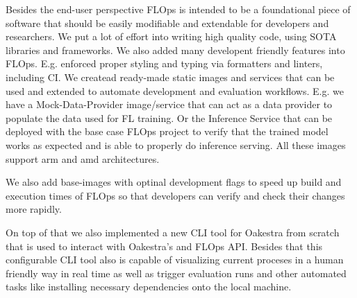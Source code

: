 Besides the end-user perspective FLOps is intended to be a foundational piece of software
that should be easily modifiable and extendable for developers and researchers.
We put a lot of effort into writing high quality code, using SOTA libraries and frameworks.
We also added many developent friendly features into FLOps.
E.g. enforced proper styling and typing via formatters and linters, including CI.
We createad ready-made static images and services that can be used and extended to automate development and evaluation workflows.
E.g. we have a Mock-Data-Provider image/service that can act as a data provider to populate the data used for FL training.
Or the Inference Service that can be deployed with the base case FLOps project to 
verify that the trained model works as expected and is able to properly do inference serving.
All these images support arm and amd architectures.

We also add base-images with optinal development flags to speed up build and execution times of FLOps
so that developers can verify and check their changes more rapidly.

On top of that we also implemented a new CLI tool for Oakestra from scratch
that is used to interact with Oakestra's and FLOps API.
Besides that this configurable CLI tool also is capable of visualizing 
current proceses in a human friendly way in real time as well as trigger evaluation runs and
other automated tasks like installing necessary dependencies onto the local machine.